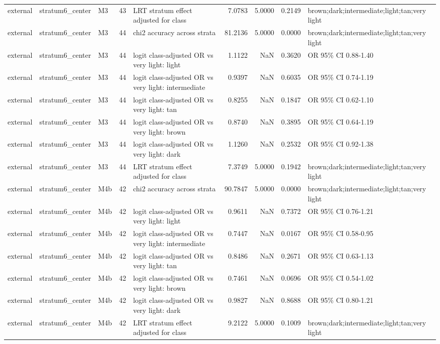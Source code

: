 \begin{tabular}{lllrlrrrl}
external & stratum6\_center & M3 & 43 & LRT stratum effect adjusted for class & 7.0783 & 5.0000 & 0.2149 & brown;dark;intermediate;light;tan;very light \\
external & stratum6\_center & M3 & 44 & chi2 accuracy across strata & 81.2136 & 5.0000 & 0.0000 & brown;dark;intermediate;light;tan;very light \\
external & stratum6\_center & M3 & 44 & logit class-adjusted OR vs very light: light & 1.1122 & NaN & 0.3620 & OR 95\% CI 0.88-1.40 \\
external & stratum6\_center & M3 & 44 & logit class-adjusted OR vs very light: intermediate & 0.9397 & NaN & 0.6035 & OR 95\% CI 0.74-1.19 \\
external & stratum6\_center & M3 & 44 & logit class-adjusted OR vs very light: tan & 0.8255 & NaN & 0.1847 & OR 95\% CI 0.62-1.10 \\
external & stratum6\_center & M3 & 44 & logit class-adjusted OR vs very light: brown & 0.8740 & NaN & 0.3895 & OR 95\% CI 0.64-1.19 \\
external & stratum6\_center & M3 & 44 & logit class-adjusted OR vs very light: dark & 1.1260 & NaN & 0.2532 & OR 95\% CI 0.92-1.38 \\
external & stratum6\_center & M3 & 44 & LRT stratum effect adjusted for class & 7.3749 & 5.0000 & 0.1942 & brown;dark;intermediate;light;tan;very light \\
external & stratum6\_center & M4b & 42 & chi2 accuracy across strata & 90.7847 & 5.0000 & 0.0000 & brown;dark;intermediate;light;tan;very light \\
external & stratum6\_center & M4b & 42 & logit class-adjusted OR vs very light: light & 0.9611 & NaN & 0.7372 & OR 95\% CI 0.76-1.21 \\
external & stratum6\_center & M4b & 42 & logit class-adjusted OR vs very light: intermediate & 0.7447 & NaN & 0.0167 & OR 95\% CI 0.58-0.95 \\
external & stratum6\_center & M4b & 42 & logit class-adjusted OR vs very light: tan & 0.8486 & NaN & 0.2671 & OR 95\% CI 0.63-1.13 \\
external & stratum6\_center & M4b & 42 & logit class-adjusted OR vs very light: brown & 0.7461 & NaN & 0.0696 & OR 95\% CI 0.54-1.02 \\
external & stratum6\_center & M4b & 42 & logit class-adjusted OR vs very light: dark & 0.9827 & NaN & 0.8688 & OR 95\% CI 0.80-1.21 \\
external & stratum6\_center & M4b & 42 & LRT stratum effect adjusted for class & 9.2122 & 5.0000 & 0.1009 & brown;dark;intermediate;light;tan;very light \\

\end{tabular}
